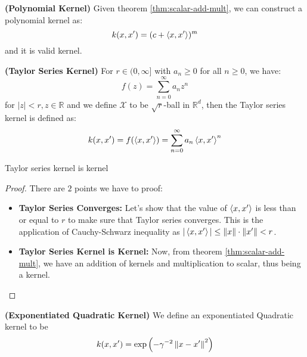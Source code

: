 \begin{definition}{\textbf{(Polynomial Kernel)}}
    Given theorem \ref{thm:scalar-add-mult}, we can construct a polynomial kernel as:
    \begin{equation*}
        k(x, x') = (c + \left\langle x, x' \right\rangle)^m
    \end{equation*}
    and it is valid kernel. 
\end{definition}

\begin{definition}{\textbf{(Taylor Series Kernel)}}
    For $r\in(0,\infty]$ with $a_n\ge0$ for all $n\ge0$, we have: 
    \begin{equation*}
        f(z) = \sum^\infty_{n=0}a_nz^n
    \end{equation*}
    for $|z|<r, z\in \mathbb{R}$ and we define $\mathcal{X}$ to be $\sqrt{r}$-ball in $\mathbb{R}^d$, then the Taylor series kernel is defined as:
    \begin{equation*}
        k(x, x') = f(\left\langle x, x' \right\rangle) = \sum^\infty_{n=0}a_n\left\langle x, x' \right\rangle^n
    \end{equation*}
\end{definition}

\begin{lemma}
    Taylor series kernel is kernel
\end{lemma}
\begin{proof}
    There are $2$ points we have to proof:
    \begin{itemize}
        \item \textbf{Taylor Series Converges: } Let's show that the value of $\left\langle x, x' \right\rangle$ is less than or equal to $r$ to make sure that Taylor series converges. This is the application of Cauchy-Schwarz inequality as $|\left\langle x,x' \right\rangle|\le\left\lVert x\right\rVert\cdot\left\lVert x'\right\rVert < r$. 
        \item \textbf{Taylor Series Kernel is Kernel: } Now, from theorem \ref{thm:scalar-add-mult}, we have an addition of kernels and multiplication to scalar, thus being a kernel.
    \end{itemize}
\end{proof}

\begin{definition}{\textbf{(Exponentiated Quadratic Kernel)}}
    We define an exponentiated Quadratic kernel to be 
    \begin{equation*}
        k(x, x') = \exp\left( -\gamma^{-2}\left\lVert x-x'\right\rVert^2 \right)
    \end{equation*}
\end{definition}

